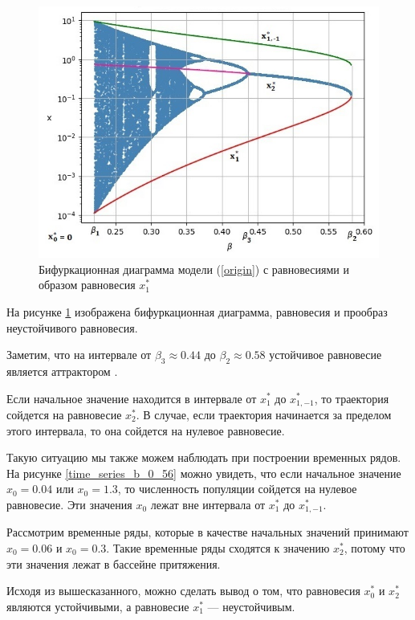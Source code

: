     \begin{figure}
        \centering
        \includegraphics[width=\textwidth]{deterministic/images/bifurcation_attract.jpg}

        \captionsetup{justification=centering}
        \caption{Бифуркационная диаграмма модели (\ref{origin}) с равновесиями и образом равновесия \(x_1^*\) }
        \label{bifurcation_attractor}
    \end{figure}

    На рисунке \ref{bifurcation_attractor} изображена бифуркационная диаграмма, равновесия и прообраз неустойчивого равновесия.

    Заметим, что на интервале от \(\beta_3 \approx 0.44\) до \(\beta_2 \approx 0.58\) устойчивое равновесие является аттрактором \cite{elementsOfNonlinearDynamic}.

    Если начальное значение находится в интервале от \(x_1^*\) до \(x_{1, -1}^*\), то траектория сойдется на равновесие \(x_2^*\). В случае, если траектория начинается за пределом этого интервала, то она сойдется на нулевое равновесие.

    Такую ситуацию мы также можем наблюдать при построении временных рядов. На рисунке \ref{time_series_b_0_56} можно увидеть, что если начальное значение \(x_0 = 0.04\) или \(x_0 = 1.3\), то численность популяции сойдется на нулевое равновесие. Эти значения \(x_0\) лежат вне интервала от \(x_1^*\) до \(x_{1, -1}^*\).

    Рассмотрим временные ряды, которые в качестве начальных значений принимают \(x_0 = 0.06\) и \(x_0 = 0.3\). Такие временные ряды сходятся к значению \(x_2^*\), потому что эти значения лежат в бассейне притяжения.

    Исходя из вышесказанного, можно сделать вывод о том, что равновесия \(x_0^*\) и \(x_2^*\) являются устойчивыми, а равновесие \(x_1^*\) --- неустойчивым.
